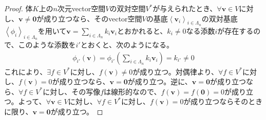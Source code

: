 \documentclass[dvipdfmx]{jsarticle}
\begin{document}
\begin{proof}
体$K$上の$n$次元vector空間$V$の双対空間$V^{*}$が与えられたとき、$\forall\mathbf{v} \in V$に対し、$\mathbf{v} \neq \mathbf{0}$が成り立つなら、そのvector空間$V$の基底$\left\langle \mathbf{v}_{i} \right\rangle_{i \in \varLambda_{n}}$の双対基底$\left\langle \phi_{i} \right\rangle_{i \in \varLambda_{n}}$を用いて$\mathbf{v} = \sum_{i \in \varLambda_{n}} {k_{i}\mathbf{v}_{i}}$とおかれると、$k_{i} \neq 0$なる添数$i$が存在するので、このような添数を$i'$とおくと、次のようになる。
\begin{align*}
\phi_{i'}\left( \mathbf{v} \right) = \phi_{i'}\left( \sum_{i \in \varLambda_{n}} {k_{i}\mathbf{v}_{i}} \right) = k_{i'} \neq 0
\end{align*}
これにより、$\exists f \in V^{*}$に対し、$f\left( \mathbf{v} \right) \neq 0$が成り立つ。対偶律より、$\forall f \in V^{*}$に対し、$f\left( \mathbf{v} \right) = 0$が成り立つなら、$\mathbf{v} = \mathbf{0}$が成り立つ。逆に、$\mathbf{v} = \mathbf{0}$が成り立つなら、$\forall f \in V^{*}$に対し、その写像$f$は線形的なので、$f\left( \mathbf{v} \right) = f\left( \mathbf{0} \right) = 0$が成り立つ。よって、$\forall\mathbf{v} \in V$に対し、$\forall f \in V^{*}$に対し、$f\left( \mathbf{v} \right) = 0$が成り立つならそのときに限り、$\mathbf{v} = \mathbf{0}$が成り立つ。
\end{proof}
\end{document}
